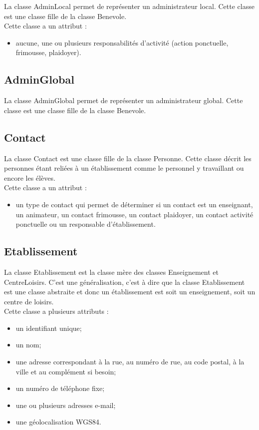 \documentclass[asi, sansVersion]{picInsa}
\begin{document}
La classe AdminLocal permet de représenter un administrateur local. Cette classe est une classe fille de la classe Benevole.\\
Cette classe a un attribut :
\begin{itemize}
\item aucune, une ou plusieurs responsabilités d'activité (action ponctuelle, frimousse, plaidoyer). 
\end{itemize}

\subsection*{AdminGlobal}

La classe AdminGlobal permet de représenter un administrateur global. Cette classe est une classe fille de la classe Benevole. 

\subsection*{Contact}

La classe Contact est une classe fille de la classe Personne. Cette classe décrit les personnes étant reliées à un établissement comme le personnel y travaillant ou encore les élèves. \\
Cette classe a un attribut : 
\begin{itemize}
\item un type de contact qui permet de déterminer si un contact est un enseignant, un animateur, un contact frimousse, un contact plaidoyer, un contact activité ponctuelle ou un responsable d'établissement.
\end{itemize} 


\subsection*{Etablissement}

La classe Etablissement est la classe mère des classes Enseignement et CentreLoisirs. C'est une généralisation, c'est à dire que la classe Etablissement est une classe abstraite et donc un établissement est soit un enseignement, soit un centre de loisirs. \\
Cette classe a plusieurs attributs : 
\begin{itemize}
\item un identifiant unique;
\item un nom;
\item une adresse correspondant à la rue, au numéro de rue, au code postal, à la ville et au complément si besoin; %
\item un numéro de téléphone fixe;
\item une ou plusieurs adresses e-mail; %
\item une géolocalisation WGS84. %
\end{itemize}
\end{document}
